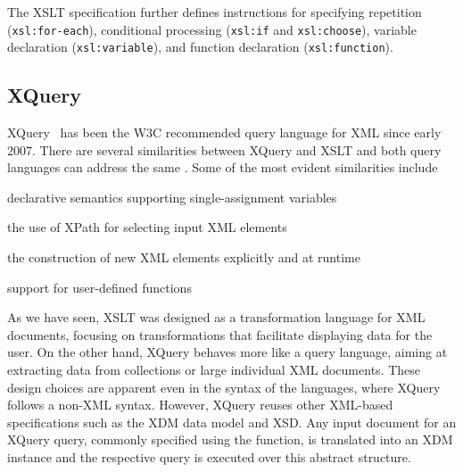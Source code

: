 The \ac{XSLT} specification further defines instructions for specifying repetition (\texttt{xsl:for-each}), conditional
processing (\texttt{xsl:if} and \texttt{xsl:choose}), variable declaration (\texttt{xsl:variable}), and function
declaration (\texttt{xsl:function}).  
%





\subsection{XQuery}
\label{sec:xquery}

XQuery~\cite{ChamberlinRobieBoag:2010aa} has been the \ac{W3C} recommended query language for \ac{XML} since early 2007.
%
There are several similarities between XQuery and \ac{XSLT} and both query languages can address the same \usecases.
Some of the most evident similarities include
\begin{enumerate*}[nosep,label=(\roman*), before=\unskip{: }, after=\unskip{.}, itemjoin={{; }}, itemjoin*={{; and }}]
\item declarative semantics supporting single-assignment variables
\item the use of \ac{XPath} for selecting input \ac{XML} elements
\item the construction of new \ac{XML} elements explicitly and at runtime
\item support for user-defined functions
\end{enumerate*}



As we have seen, \ac{XSLT} was designed as a transformation language for \ac{XML} documents, focusing on transformations
that facilitate displaying data for the user.  On the other hand, XQuery behaves more like a query language, aiming at
extracting data from collections or large individual \ac{XML} documents.
% 
These design choices are apparent even in the syntax of the languages, where XQuery follows a non-\ac{XML} syntax.
% 
However, XQuery reuses other \ac{XML}-based specifications such as the \ac{XDM} data model and \ac{XSD}.
%
Any input document for an XQuery query, commonly specified using the  function, is translated
into an \ac{XDM} instance and the respective query is executed over this abstract structure.
%

